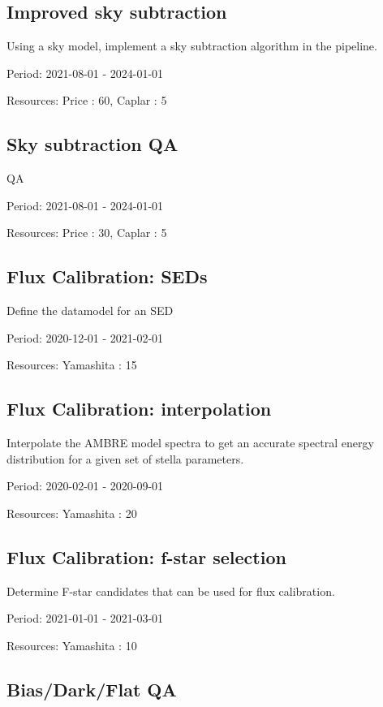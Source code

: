 \subsection{Improved sky subtraction}

Using a sky model, implement a sky subtraction algorithm in the pipeline.

Period: 2021-08-01 - 2024-01-01

Resources: Price : 60, Caplar : 5

\subsection{Sky subtraction QA}

QA

Period: 2021-08-01 - 2024-01-01

Resources: Price : 30, Caplar : 5

\subsection{Flux Calibration: SEDs}

Define the datamodel for an SED

Period: 2020-12-01 - 2021-02-01

Resources: Yamashita : 15

\subsection{Flux Calibration: interpolation}

Interpolate the AMBRE model spectra to get an accurate spectral energy distribution for a given set of stella parameters.

Period: 2020-02-01 - 2020-09-01

Resources: Yamashita : 20

\subsection{Flux Calibration: f-star selection}

Determine F-star candidates that can be used for flux calibration.

Period: 2021-01-01 - 2021-03-01

Resources: Yamashita : 10

\subsection{Bias/Dark/Flat QA}

